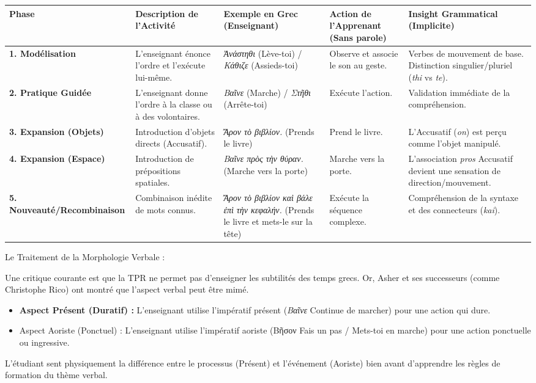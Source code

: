 \begin{table}[h!]\small\centering\begin{tabular}{| l | l | l | l | l |}\hline\textbf{Phase} & \textbf{Description de l'Activité} & \textbf{Exemple en Grec (Enseignant)} & \textbf{Action de l'Apprenant (Sans parole)} & \textbf{Insight Grammatical (Implicite)} \\ \hline\textbf{1. Modélisation} & L'enseignant énonce l'ordre et l'exécute lui-même. & \textit{Ἀνάστηθι\!} (Lève-toi) / \textit{Κάθιζε\!} (Assieds-toi) & Observe et associe le son au geste. & Verbes de mouvement de base. Distinction singulier/pluriel (\textit{\-thi} vs \textit{\-te}). \\ \hline\textbf{2. Pratique Guidée} & L'enseignant donne l'ordre à la classe ou à des volontaires. & \textit{Bαῖνε\!} (Marche) / \textit{Στῆθι\!} (Arrête-toi) & Exécute l'action. & Validation immédiate de la compréhension. \\ \hline\textbf{3. Expansion (Objets)} & Introduction d'objets directs (Accusatif). & \textit{Ἄρον τὸ βιβλίον.} (Prends le livre) & Prend le livre. & L'Accusatif (\textit{\-on}) est perçu comme l'objet manipulé. \\ \hline\textbf{4. Expansion (Espace)} & Introduction de prépositions spatiales. & \textit{Bαῖνε πρὸς τὴν θύραν.} (Marche vers la porte) & Marche vers la porte. & L'association \textit{pros} \+ Accusatif devient une sensation de direction/mouvement. \\ \hline\textbf{5. Nouveauté/Recombinaison} & Combinaison inédite de mots connus. & \textit{Ἄρον τὸ βιβλίον καὶ βάλε ἐπὶ τὴν κεφαλήν.} (Prends le livre et mets-le sur la tête) & Exécute la séquence complexe. & Compréhension de la syntaxe et des connecteurs (\textit{kai}). \\ \hline\end{tabular}\end{table}Le Traitement de la Morphologie Verbale :

Une critique courante est que la TPR ne permet pas d'enseigner les subtilités des temps grecs. Or,
Asher et ses successeurs (comme Christophe Rico) ont montré que l'aspect verbal peut être
mimé.\cite{III-2-2-ref26}

\begin{itemize}\item \textbf{Aspect Présent (Duratif) :} L'enseignant utilise l'impératif présent (\textit{Bαῖνε} \- Continue de marcher) pour une action qui dure.\item Aspect Aoriste (Ponctuel) : L'enseignant utilise l'impératif aoriste (Bῆσον \- Fais un pas / Mets-toi en marche) pour une action ponctuelle ou ingressive.\end{itemize}L'étudiant \og sent\fg{} physiquement la différence entre le processus (Présent) et l'événement
(Aoriste) bien avant d'apprendre les règles de formation du thème verbal.



